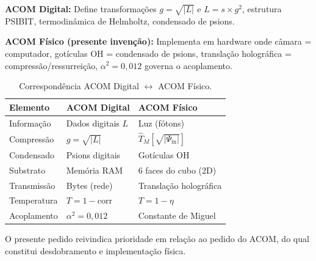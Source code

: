 \documentclass[12pt,a4paper]{article}
\newcommand{\alphaii}{\alpha^2}
\newcommand{\TM}{\hat{T}_M}
\begin{document}
\textbf{ACOM Digital:} Define transformações $g = \sqrt{|L|}$
e $L = s \times g^2$, estrutura PSIBIT, termodinâmica de
Helmholtz, condensado de psions.

\textbf{ACOM Físico (presente invenção):} Implementa em
hardware onde câmara = computador, gotículas OH = condensado de
psions, translação holográfica = compressão/ressurreição,
$\alphaii = 0{,}012$ governa o acoplamento.

\begin{table}[H]
\centering
\caption{Correspondência ACOM Digital $\longleftrightarrow$
  ACOM Físico.}
\begin{tabular}{lll}
\toprule
\textbf{Elemento} & \textbf{ACOM Digital}
  & \textbf{ACOM Físico} \\
\midrule
Informação & Dados digitais $L$ & Luz (fótons) \\
Compressão & $g = \sqrt{|L|}$ &
  $\TM[\sqrt{|\Psi_{\text{in}}|}]$ \\
Condensado & Psions digitais & Gotículas OH \\
Substrato & Memória RAM & 6 faces do cubo (2D) \\
Transmissão & Bytes (rede) & Translação holográfica \\
Temperatura & $T = 1 - \text{corr}$ & $T = 1 - \eta$ \\
Acoplamento & $\alphaii = 0{,}012$ & Constante de Miguel \\
\bottomrule
\end{tabular}
\end{table}

O presente pedido reivindica prioridade em relação ao pedido do
ACOM, do qual constitui desdobramento e implementação física.
\end{document}
